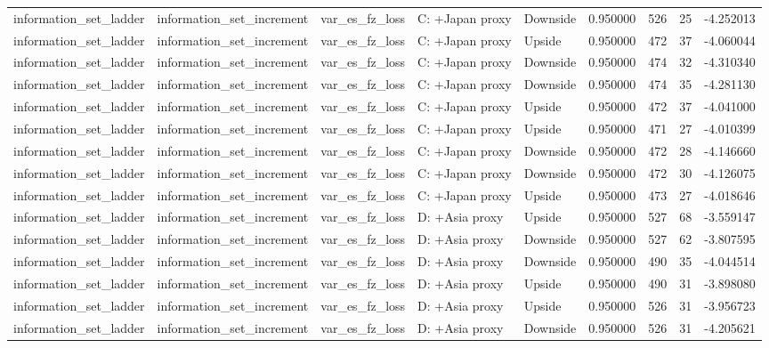 \begin{tabular}{lllllrrr}
information\_set\_ladder & information\_set\_increment & var\_es\_fz\_loss & C: +Japan proxy & Downside & 0.950000 & 526 & 25 & -4.252013 \\
information\_set\_ladder & information\_set\_increment & var\_es\_fz\_loss & C: +Japan proxy & Upside & 0.950000 & 472 & 37 & -4.060044 \\
information\_set\_ladder & information\_set\_increment & var\_es\_fz\_loss & C: +Japan proxy & Downside & 0.950000 & 474 & 32 & -4.310340 \\
information\_set\_ladder & information\_set\_increment & var\_es\_fz\_loss & C: +Japan proxy & Downside & 0.950000 & 474 & 35 & -4.281130 \\
information\_set\_ladder & information\_set\_increment & var\_es\_fz\_loss & C: +Japan proxy & Upside & 0.950000 & 472 & 37 & -4.041000 \\
information\_set\_ladder & information\_set\_increment & var\_es\_fz\_loss & C: +Japan proxy & Upside & 0.950000 & 471 & 27 & -4.010399 \\
information\_set\_ladder & information\_set\_increment & var\_es\_fz\_loss & C: +Japan proxy & Downside & 0.950000 & 472 & 28 & -4.146660 \\
information\_set\_ladder & information\_set\_increment & var\_es\_fz\_loss & C: +Japan proxy & Downside & 0.950000 & 472 & 30 & -4.126075 \\
information\_set\_ladder & information\_set\_increment & var\_es\_fz\_loss & C: +Japan proxy & Upside & 0.950000 & 473 & 27 & -4.018646 \\
information\_set\_ladder & information\_set\_increment & var\_es\_fz\_loss & D: +Asia proxy & Upside & 0.950000 & 527 & 68 & -3.559147 \\
information\_set\_ladder & information\_set\_increment & var\_es\_fz\_loss & D: +Asia proxy & Downside & 0.950000 & 527 & 62 & -3.807595 \\
information\_set\_ladder & information\_set\_increment & var\_es\_fz\_loss & D: +Asia proxy & Downside & 0.950000 & 490 & 35 & -4.044514 \\
information\_set\_ladder & information\_set\_increment & var\_es\_fz\_loss & D: +Asia proxy & Upside & 0.950000 & 490 & 31 & -3.898080 \\
information\_set\_ladder & information\_set\_increment & var\_es\_fz\_loss & D: +Asia proxy & Upside & 0.950000 & 526 & 31 & -3.956723 \\
information\_set\_ladder & information\_set\_increment & var\_es\_fz\_loss & D: +Asia proxy & Downside & 0.950000 & 526 & 31 & -4.205621 \\

\end{tabular}

